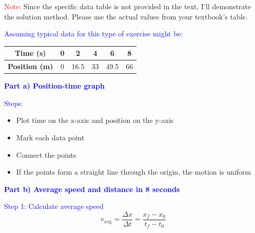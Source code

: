 \begin{exercise}
\begin{solu}
        \vspace{0.3cm}

        \textcolor{red}{Note:} Since the specific data table is not provided in the text, I'll demonstrate the solution method. Please use the actual values from your textbook's table.

        \textcolor{blue}{Assuming typical data for this type of exercise might be:}
        \begin{center}
            \begin{tabular}{@{}cccccc@{}}
                \toprule
                \textbf{Time (s)} & \textbf{0} & \textbf{2} & \textbf{4} & \textbf{6} & \textbf{8} \\
                \midrule
                \textbf{Position (m)} & 0 & 16.5 & 33 & 49.5 & 66 \\
                \bottomrule
            \end{tabular}
        \end{center}

        \textbf{\textcolor{blue}{Part a) Position-time graph}}

        \textcolor{blue}{Steps:}
        \begin{itemize}
            \item Plot time on the x-axis and position on the y-axis
            \item Mark each data point
            \item Connect the points
            \item If the points form a straight line through the origin, the motion is uniform
        \end{itemize}

        \textbf{\textcolor{blue}{Part b) Average speed and distance in 8 seconds}}

        \textcolor{blue}{Step 1: Calculate average speed}
        \[
            \boxed{v_{\text{avg}} = \frac{\Delta x}{\Delta t} = \frac{x_f - x_0}{t_f - t_0}}
        \]


\end{solu}
\end{exercise}
